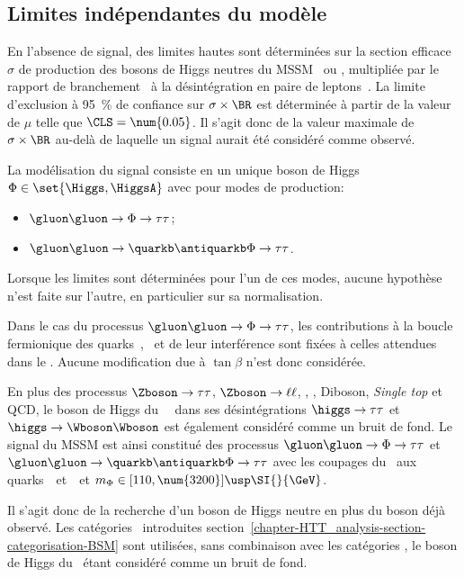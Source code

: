 \subsection{Limites indépendantes du modèle}\label{chapter-HTT_analysis-section-signal_extraction-model_indep_and_likelihood}
En l'absence de signal, des limites hautes sont déterminées sur la section efficace $\sigma$ de production des bosons de Higgs neutres du MSSM \Higgs\ ou \HiggsA, multipliée par le rapport de branchement \BR\ à la désintégration en paire de leptons~\tau.
La limite d'exclusion à \SI{95}{\%} de confiance sur $\sigma\times\BR$ est déterminée à partir de la valeur de $\mu$ telle que $\CLS = \num{0.05}$.
Il s'agit donc de la valeur maximale de $\sigma\times\BR$ au-delà de laquelle un signal aurait été considéré comme observé.
\par
La modélisation du signal consiste en un unique boson de Higgs $\Phi \in \set{ \Higgs , \HiggsA }$ avec pour modes de production:
\begin{itemize}
\item $\gluon\gluon\to\Phi\to\tau\tau$;
\item $\gluon\gluon\to\quarkb\antiquarkb\Phi\to\tau\tau$.
\end{itemize}
Lorsque les limites sont déterminées pour l'un de ces modes, aucune hypothèse n'est faite sur l'autre, en particulier sur sa normalisation.
\par
Dans le cas du processus $\gluon\gluon\to\Phi\to\tau\tau$, les contributions à la boucle fermionique des quarks~\quarkt, \quarkb\ et de leur interférence sont fixées à celles attendues dans le \SM.
Aucune modification due à $\tan\beta$ n'est donc considérée.
\par
En plus des processus
$\Zboson\to\tau\tau$,
$\Zboson\to\ell\ell$,
\Wjets,
\ttbar,
Diboson, \emph{Single top}
et
QCD,
le boson de Higgs du \SM\ \higgs\ dans ses désintégrations
$\higgs\to\tau\tau$
et
$\higgs\to\Wboson\Wboson$
est également considéré comme un bruit de fond.
Le signal du MSSM est ainsi constitué des processus
$\gluon\gluon\to\Phi\to\tau\tau$
et
$\gluon\gluon\to\quarkb\antiquarkb\Phi\to\tau\tau$
avec les coupages du \SM\ aux quarks~\quarkt\ et~\quarkb\
et $m_\Phi\in[110, \num{3200}]\usp\SI{}{\GeV}$.
\par
Il s'agit donc de la recherche d'un boson de Higgs neutre en plus du boson déjà observé.
Les catégories \CATbsm\ introduites section~\ref{chapter-HTT_analysis-section-categorisation-BSM} sont utilisées, sans combinaison avec les catégories \CATsm, le boson de Higgs du \SM\ étant considéré comme un bruit de fond.
